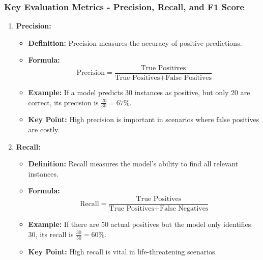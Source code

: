 \documentclass[aspectratio=169]{beamer}
\begin{document}
\begin{frame}[fragile]
    \frametitle{Key Evaluation Metrics - Precision, Recall, and F1 Score}
    \begin{enumerate}
        \item \textbf{Precision:}
        \begin{itemize}
            \item \textbf{Definition:} Precision measures the accuracy of positive predictions.
            \item \textbf{Formula:}  
            \begin{equation}
                \text{Precision} = \frac{\text{True Positives}}{\text{True Positives} + \text{False Positives}}
            \end{equation}
            \item \textbf{Example:} If a model predicts 30 instances as positive, but only 20 are correct, its precision is \( \frac{20}{30} = 67\%\).
            \item \textbf{Key Point:} High precision is important in scenarios where false positives are costly.
        \end{itemize}
        
        \item \textbf{Recall:}
        \begin{itemize}
            \item \textbf{Definition:} Recall measures the model’s ability to find all relevant instances.
            \item \textbf{Formula:}  
            \begin{equation}
                \text{Recall} = \frac{\text{True Positives}}{\text{True Positives} + \text{False Negatives}}
            \end{equation}
            \item \textbf{Example:} If there are 50 actual positives but the model only identifies 30, its recall is \( \frac{30}{50} = 60\%\).
            \item \textbf{Key Point:} High recall is vital in life-threatening scenarios.
        \end{itemize}
        

\end{enumerate}
\end{frame}
\end{document}
